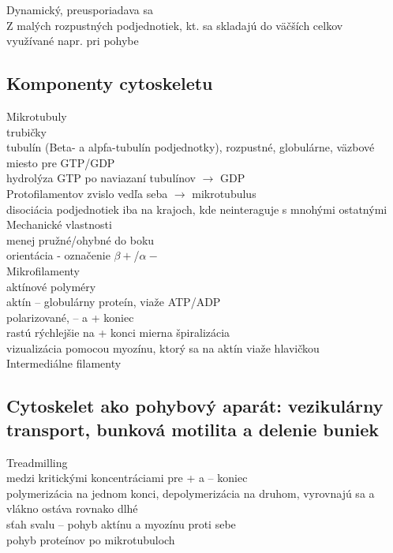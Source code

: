 Dynamický, preusporiadava sa\\
Z malých rozpustných podjednotiek, kt. sa skladajú do väčších celkov\\
\tab využívané napr. pri pohybe\\
\subsection*{Komponenty cytoskeletu}
Mikrotubuly\\
\tab trubičky\\
\tab tubulín (Beta- a alpfa-tubulín podjednotky), rozpustné, globulárne, väzbové miesto pre GTP/GDP\\
\tab hydrolýza GTP po naviazaní tubulínov $\rightarrow$ GDP\\
 Protofilamentov zvislo vedľa seba $\rightarrow$ mikrotubulus\\
\tab disociácia podjednotiek iba na krajoch, kde neinteraguje s mnohými ostatnými\\

Mechanické vlastnosti\\
\tab menej pružné/ohybné do boku\\
\tab orientácia - označenie $\beta+$/$\alpha-$\\

Mikrofilamenty\\
\tab aktínové polyméry\\
\tab aktín -- globulárny proteín, viaže ATP/ADP\\
\tab polarizované, -- a + koniec\\
\tab rastú rýchlejšie na + konci
\tab mierna špiralizácia\\
\tab vizualizácia pomocou myozínu, ktorý sa na aktín viaže hlavičkou\\

Intermediálne filamenty\\
\subsection*{Cytoskelet ako pohybový aparát: vezikulárny transport, bunková motilita a delenie buniek}
Treadmilling\\
\tab medzi kritickými koncentráciami pre + a -- koniec\\
\tab polymerizácia na jednom konci, depolymerizácia na druhom, vyrovnajú sa a vlákno ostáva rovnako dlhé\\
sťah svalu -- pohyb aktínu a myozínu proti sebe\\
pohyb proteínov po mikrotubuloch\\

